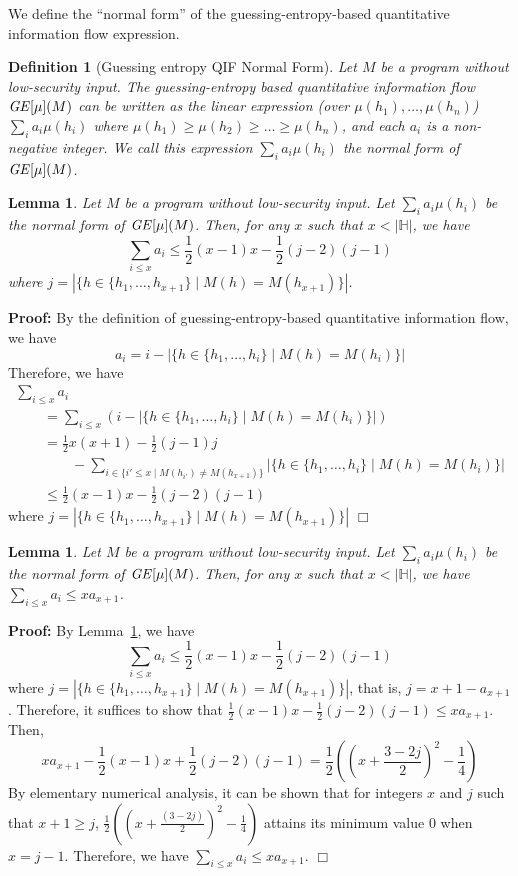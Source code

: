 \documentclass{llncs}
\newtheorem{definition}[theorem]{Definition}
\newtheorem{lemma}[theorem]{Lemma}
\newenvironment{proof}{\noindent\rm{\bf Proof:}}{\hbox{$\Box$}\vspace*{0.2\baselineskip}}
\newcommand{\aset}[1]{\{{#1}\}}
\begin{document}
We define the ``normal form'' of the guessing-entropy-based quantitative
information flow expression.
\begin{definition}[Guessing entropy QIF Normal Form]
Let $M$ be a program without low-security input.  The guessing-entropy
based quantitative information flow ${\it GE}[\mu](M)$ can be written
as the linear expression (over $\mu(h_1),\dots,\mu(h_n)$) $\sum_i
a_i\mu(h_i)$ where $\mu(h_1)\ge\mu(h_2)\ge\dots\ge\mu(h_n)$, and each
$a_i$ is a non-negative integer.  We call this expression $\sum_i
a_i\mu(h_i)$ the {\em normal form} of ${\it GE}[\mu](M)$.
\end{definition}

\begin{lemma}
\label{lem:gecc1}
Let $M$ be a program without low-security input.  Let $\sum_i
a_i\mu(h_i)$ be the normal form of ${\it GE}[\mu](M)$.  Then, for any
$x$ such that $x < |\mathbb{H}|$, we have 
\[
\sum_{i\le x} a_i \le
\frac{1}{2}(x-1)x-\frac{1}{2}(j-2)(j-1)
\]
where $j=|\aset{h\in\aset{h_1,\dots,h_{x+1}}\mid M(h)=M(h_{x+1})}|$.
\end{lemma}
\begin{proof}
  By the definition of guessing-entropy-based quantitative information
  flow, we have 
\[
a_i=i-|\aset{h\in\aset{h_1,\dots,h_i}\mid
    M(h)=M(h_i)}|
\]
Therefore, we have
\[
\begin{array}{l}
  \sum_{i\le x} a_i\\ \qquad=\sum_{i\le x}
  (i-|\aset{h\in\aset{h_1,\dots,h_i}\mid M(h)=M(h_i)}|)\\
  \qquad=\frac{1}{2}x(x+1)-\frac{1}{2}(j-1)j\\
\qquad\qquad-\sum_{i\in\aset{i' \leq x\mid
  M(h_{i'})\not=M(h_{x+1})}}|\aset{h\in\aset{h_1,\dots,h_i}\mid
  M(h)=M(h_i)}|\\ 
\qquad\le\frac{1}{2}(x-1)x-\frac{1}{2}(j-2)(j-1)
\end{array}
\]
where $j=|\aset{h\in\aset{h_1,\dots,h_{x+1}}\mid
  M(h)=M(h_{x+1})}|$
\end{proof}

\begin{lemma}
\label{lem:gecc2}
Let $M$ be a program without low-security input.  Let $\sum_i
a_i\mu(h_i)$ be the normal form of ${\it GE}[\mu](M)$.  Then, for any
$x$ such that $x < |\mathbb{H}|$, we have $\sum_{i\le x} a_i \le x a_{x+1}$.
\end{lemma}
\begin{proof}
  By Lemma~\ref{lem:gecc1}, we have 
\[
\sum_{i\le x} a_i \le
  \frac{1}{2}(x-1)x-\frac{1}{2}(j-2)(j-1)
\]
 where $j=|\aset{h\in\aset{h_1,\dots,h_{x+1}}\mid
 M(h)=M(h_{x+1})}|$, that is, $j=x+1-a_{x+1}$.  Therefore,
 it suffices to show that $\frac{1}{2}(x-1)x-\frac{1}{2}(j-2)(j-1)\le
 x a_{x+1}$.  Then,
\[
x a_{x+1} -\frac{1}{2}(x-1)x+\frac{1}{2}(j-2)(j-1)
=\frac{1}{2}((x+\frac{3-2j}{2})^2-\frac{1}{4})
\]
By elementary numerical analysis, it can be shown that for integers
$x$ and $j$ such that $x+1\ge j$, $\frac{1}{2}((x+ \frac{(3-2j)}{2})^2
- \frac{1}{4})$ attains its minimum value $0$ when $x = j-1$.
Therefore, we have $\sum_{i\le x} a_i \le x a_{x+1}$.
\end{proof}
\end{document}
